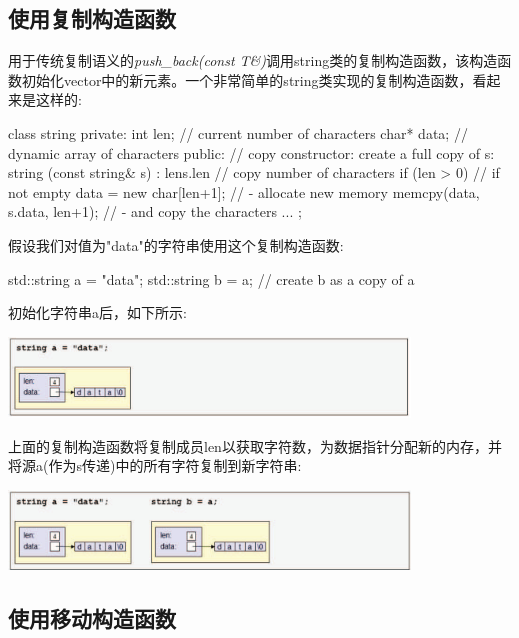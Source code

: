 \subsection{使用复制构造函数}

用于传统复制语义的\textit{push_back(const T\&)}调用string类的复制构造函数，该构造函数初始化vector中的新元素。一个非常简单的string类实现的复制构造函数，看起来是这样的:

\begin{cppcode}
class string {
	private:
	int len; // current number of characters
	char* data; // dynamic array of characters
	public:
	// copy constructor: create a full copy of s:
	string (const string& s)
	: len{s.len} { // copy number of characters
		if (len > 0) { // if not empty
			data = new char[len+1]; // - allocate new memory
			memcpy(data, s.data, len+1); // - and copy the characters
		}
	}
	...
};
\end{cppcode}

假设我们对值为"data"的字符串使用这个复制构造函数:

\begin{cppcode}
std::string a = "data";
std::string b = a; // create b as a copy of a
\end{cppcode}

初始化字符串a后，如下所示:

\begin{center}
	\includegraphics[width=0.8\textwidth]{part1/ch1/images/18}
\end{center}

上面的复制构造函数将复制成员len以获取字符数，为数据指针分配新的内存，并将源a(作为s传递)中的所有字符复制到新字符串:

\begin{center}
	\includegraphics[width=0.8\textwidth]{part1/ch1/images/19}
\end{center}

\subsection{使用移动构造函数}

